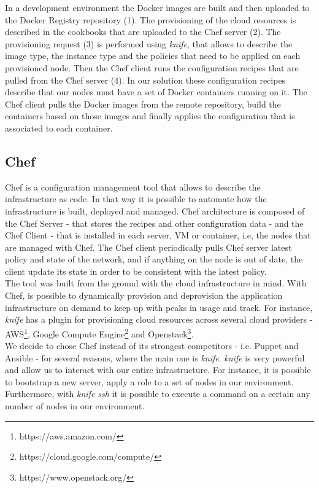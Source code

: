 In a development environment the Docker images are built and then uploaded to the Docker Registry
repository (1). The provisioning of the cloud resources is described in the cookbooks that are uploaded
to the Chef server (2). The provisioning request (3) is performed using \textit{knife}, that allows to
describe the image type, the instance type and the policies that need to be applied on each provisioned node.
Then the Chef client runs the configuration recipes that are pulled from the Chef server (4). In our
solution these configuration recipes describe that our nodes must have a set of Docker containers
running on it. The Chef client pulls the Docker images from the remote repository, build the containers
based on those images and finally applies the configuration that is associated to each container.

\subsection{Chef}
\label{sub:impl_chef}
Chef is a configuration management tool that allows to describe the infrastructure as code.
In that way it is possible to automate how the infrastructure is built, deployed and managed.
Chef architecture is composed of the Chef Server - that stores the recipes and other configuration
data - and the Chef Client - that is installed in each server, \gls{VM} or container, i.e, the nodes that
are managed with Chef. The Chef client periodically pulls Chef server latest policy and state of the
network, and if anything on the node is out of date, the client update its state in order to be
consistent with the latest policy.\\

The tool was built from the ground with the cloud infrastructure in mind. With Chef, is possible to
dynamically provision and deprovision the application infrastructure on demand to keep up with
peaks in usage and track. For instance, \textit{knife} has a plugin for provisioning cloud resources
across several cloud providers - \gls{AWS}\footnote{https://aws.amazon.com/}, Google Compute
Engine\footnote{https://cloud.google.com/compute/} and Openstack\footnote{https://www.openstack.org/}.\\

We decide to chose Chef instead of its strongest competitors - i.e. Puppet and Ansible - for several
reasons, where the main one is \textit{knife}. \textit{knife} is very powerful and allow us to
interact with our entire infrastructure. For instance, it is possible to bootstrap a new server,
apply a role to a set of nodes in our environment. Furthermore, with \textit{knife ssh} it is
possible to execute a command on a certain any number of nodes in our environment.


